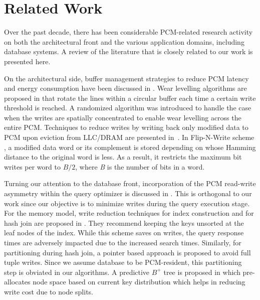 \section{Related Work}
\label{relWork}
Over the past decade, there has been considerable PCM-related research
activity on both the architectural front and the various application
domains, including database systems. A review of the literature that is
closely related to our work is presented here.

On the architectural side, buffer management strategies to reduce PCM
latency and energy consumption have been discussed in \cite{lee}. Wear
levelling algorithms are proposed in \cite{wear} that rotate the lines
within a circular buffer each time a certain write threshold is reached. A
randomized algorithm was introduced to handle the case when the writes
are spatially concentrated to enable wear levelling across the entire
PCM. Techniques to reduce writes by writing back only modified data to PCM
upon eviction from LLC/DRAM are presented in~\cite{qureshi,write,lee,zhou}. In Flip-N-Write scheme \cite{flipnwrite}, a modified data word
or its complement is stored depending on whose Hamming distance to the
original word is less. As a result, it restricts the maximum bit writes
per word to $B/2$, where \textit{B} is the number of bits in a word.

Turning our attention to the database front, incorporation of the
PCM read-write asymmetry within the query optimizer is discussed
in \cite{cost_aware}.  This is orthogonal to our work since our
objective is to minimize writes during the query execution stage. For
the \modelPcmRam{} memory model, write reduction techniques for index
construction and for hash join are proposed in \cite{chen}. They recommend
keeping the keys unsorted at the leaf nodes of the index. While this
scheme saves on writes, the query response times are adversely impacted
due to the increased search times.  Similarly, for partitioning during
hash join, a pointer based approach is proposed to avoid full tuple
writes. Since we assume database to be PCM-resident, this partitioning
step is obviated in our algorithms. A predictive $B^+$ tree is proposed in \cite{hupredictive} which pre-allocates node space based on current key distribution which helps in reducing write cost due to node splits.

